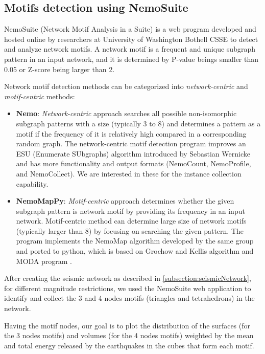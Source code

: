 \subsection{Motifs detection using NemoSuite}
NemoSuite \cite{nemosuite} (Network Motif Analysis in a Suite) is a web program developed and hosted online by researchers at University of Washington Bothell CSSE to detect and analyze network motifs. A network motif is a frequent and unique subgraph pattern in an input network, and it is determined by P-value beings smaller than 0.05 or Z-score being larger than 2.\par 

Network motif detection methods can be categorized into {\it network-centric} and {\it motif-centric} methods:
\begin{itemize}
	\item {\bf Nemo}: {\it Network-centric} approach searches all possible non-isomorphic subgraph patterns with a size (typically 3 to 8) and determines a pattern as a motif if the frequency of it is relatively high compared in a corresponding random graph. The network-centric motif detection program improves an ESU (Enumerate SUbgraphs) algorithm introduced by Sebastian Wernicke \cite{ESUmotifs} and has more functionality and output formats (NemoCount, NemoProfile, and NemoCollect). We are interested in these for the instance collection capability.
	
	\item {\bf NemoMapPy}: {\it Motif-centric} approach determines whether the given subgraph pattern is network motif by providing its frequency in an input network. Motif-centric method can determine large size of network motifs (typically larger than 8) by focusing on searching the given pattern. The program implements the NemoMap \cite{nemomap} algorithm developed by the same group and ported to python, which is based on Grochow and Kellis algorithm \cite{GK} and MODA program \cite{MODA}.
\end{itemize}


After creating the seismic network as described in \ref{subsection:seismicNetwork}, for different magnitude restrictions, we used the NemoSuite web application to identify and collect the 3 and 4 nodes motifs (triangles and tetrahedrons) in the network.\par
 Having the motif nodes, our goal is to plot the distribution of the surfaces (for the 3 nodes motifs) and volumes (for the 4 nodes motifs) weighted by the mean and total energy released by the earthquakes in the cubes that form each motif.

